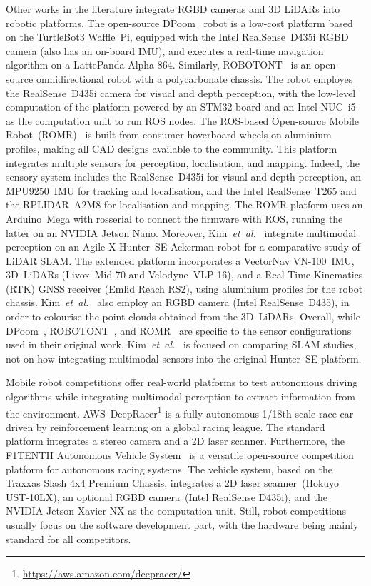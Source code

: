 \documentclass[letterpaper,10pt,conference]{IEEEtran} %
\newcommand\etal{\emph{et~al.}}
\begin{document}
Other works in the literature integrate
RGBD cameras and 3D LiDARs into robotic platforms.
The open-source DPoom~\cite{kim2022access} robot is a low-cost platform
based on the TurtleBot3 Waffle~Pi,
equipped with the Intel RealSense~D435i RGBD camera (also has an on-board IMU),
and executes a real-time navigation algorithm on a LattePanda Alpha 864.
Similarly, ROBOTONT~\cite{raudmae2023hardwarex} is an
open-source omnidirectional robot with a polycarbonate chassis.
The robot employes the RealSense~D435i camera for visual and depth perception,
with the low-level computation of the platform
powered by an STM32 board and an Intel NUC~i5 as the
computation unit to run ROS nodes.
The ROS-based Open-source Mobile Robot~(ROMR)~\cite{nwankwo2023hardwarex}
is built from consumer hoverboard wheels on aluminium profiles,
making all CAD designs available to the community.
This platform integrates multiple sensors for
perception, localisation, and mapping.
Indeed, the sensory system includes the
RealSense~D435i for visual and depth perception,
an MPU9250~IMU for tracking and localisation,
and the Intel RealSense~T265 and the RPLIDAR~A2M8 for localisation and mapping.
The ROMR platform uses an Arduino~Mega with rosserial to
connect the firmware with ROS, running the latter on an NVIDIA Jetson Nano.
Moreover, Kim~\etal~\cite{kim2022iccas} integrate multimodal perception
on an Agile-X Hunter~SE Ackerman robot for a comparative study of LiDAR SLAM.
The extended platform incorporates a VectorNav VN-100~IMU,
3D~LiDARs (Livox~Mid-70 and Velodyne~VLP-16), and a
Real-Time Kinematics (RTK) GNSS receiver (Emlid Reach RS2),
using aluminium profiles for the robot chassis.
Kim~\etal~\cite{kim2022iccas} also employ an RGBD camera
(Intel RealSense~D435),
in order to colourise the point clouds obtained from the 3D~LiDARs.
Overall, while DPoom~\cite{kim2022access},
ROBOTONT~\cite{raudmae2023hardwarex}, and
ROMR~\cite{nwankwo2023hardwarex} are specific to the sensor configurations
used in their original work,
Kim~\etal~\cite{kim2022iccas} is focused on comparing SLAM studies,
not on how integrating multimodal sensors into the original Hunter~SE platform.

Mobile robot competitions offer real-world platforms to test
autonomous driving algorithms while integrating multimodal perception
to extract information from the environment.
AWS~DeepRacer\footnote{\url{https://aws.amazon.com/deepracer/}}
is a fully autonomous 1/18th scale race car driven by reinforcement learning
on a global racing league. The standard platform integrates a stereo camera
and a 2D laser scanner.
Furthermore, the F1TENTH Autonomous Vehicle System~\cite{okelly2020neurips}
is a versatile open-source competition platform
for autonomous racing systems.
The vehicle system, based on the Traxxas Slash 4x4 Premium Chassis,
integrates a 2D laser scanner~(Hokuyo UST-10LX),
an optional RGBD camera~(Intel RealSense D435i),
and the NVIDIA Jetson Xavier NX as the computation unit.
Still, robot competitions usually focus on the software development part,
with the hardware being mainly standard for all competitors.
\end{document}
